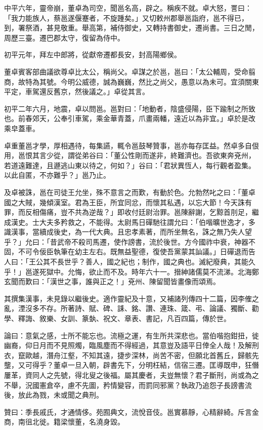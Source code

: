 \begin{pinyinscope}
中平六年，靈帝崩，董卓為司空，聞邕名高，辟之。稱疾不就。卓大怒，詈曰：「我力能族人，蔡邕遂偃蹇者，不旋踵矣。」又切敕州郡舉邕詣府，邕不得已，到，署祭酒，甚見敬重。舉高第，補侍御史，又轉持書御史，遷尚書。三日之閒，周歷三臺。遷巴郡太守，復留為侍中。

初平元年，拜左中郎將，從獻帝遷都長安，封高陽鄉侯。

董卓賓客部曲議欲尊卓比太公，稱尚父。卓謀之於邕，邕曰：「太公輔周，受命翦商，故特為其號。今明公威德，誠為巍巍，然比之尚父，愚意以為未可。宜須關東平定，車駕還反舊京，然後議之。」卓從其言。

初平二年六月，地震，卓以問邕。邕對曰：「地動者，陰盛侵陽，臣下踰制之所致也。前春郊天，公奉引車駕，乘金華青蓋，爪畫兩轓，遠近以為非宜。」卓於是改乘皁蓋車。

卓重董邕才學，厚相遇待，每集讌，輒令邕鼓琴贊事，邕亦每存匡益。然卓多自佷用，邕恨其言少從，謂從弟谷曰：「董公性剛而遂非，終難濟也。吾欲東奔兗州，若道遠難達，且遯逃山東以待之，何如？」谷曰：「君狀異恆人，每行觀者盈集。以此自匿，不亦難乎？」邕乃止。

及卓被誅，邕在司徒王允坐，殊不意言之而歎，有動於色。允勃然叱之曰：「董卓國之大賊，幾傾漢室。君為王臣，所宜同忿，而懷其私遇，以忘大節！今天誅有罪，而反相傷痛，豈不共為逆哉？」即收付廷尉治罪。邕陳辭謝，乞黥首刖足，繼成漢史。士大夫多矜救之，不能得。太尉馬日磾馳往謂允曰：「伯喈曠世逸才，多識漢事，當續成後史，為一代大典。且忠孝素著，而所坐無名，誅之無乃失人望乎？」允曰：「昔武帝不殺司馬遷，使作謗書，流於後世。方今國祚中衰，神器不固，不可令佞臣執筆在幼主左右。既無益聖德，復使吾黨蒙其訕議。」日磾退而告人曰：「王公其不長世乎？善人，國之紀也；制作，國之典也。滅紀廢典，其能久乎！」邕遂死獄中。允悔，欲止而不及。時年六十一。搢紳諸儒莫不流涕。北海鄭玄聞而歎曰：「漢世之事，誰與正之！」兗州、陳留聞皆畫像而頌焉。

其撰集漢事，未見錄以繼後史。適作靈紀及十意，又補諸列傳四十二篇，因李傕之亂，湮沒多不存。所著詩、賦、碑、誄、銘、讚、連珠、箴、弔、論議、獨斷、勸學、釋誨、敘樂、女訓、篆埶、祝文、章表、書記，凡百四篇，傳於世。

論曰：意氣之感，士所不能忘也。流極之運，有生所共深悲也。當伯喈抱鉗扭，徙幽裔，仰日月而不見照燭，臨風塵而不得經過，其意豈及語平日倖全人哉！及解刑衣，竄歐越，潛舟江壑，不知其遠，捷步深林，尚苦不密，但願北首舊丘，歸骸先壟，又可得乎？董卓一旦入朝，辟書先下，分明枉結，信宿三遷。匡導既申，狂僭屢革，資同人之先號，得北叟之後福。屬其慶者，夫豈無懷？君子斷刑，尚或為之不舉，況國憲倉卒，慮不先圖，矜情變容，而罰同邪黨？執政乃追怨子長謗書流後，放此為戮，未或聞之典刑。

贊曰：季長戚氏，才通情侈。苑囿典文，流悅音伎。邕實慕靜，心精辭綺。斥言金商，南徂北徙。籍梁懷董，名澆身毀。


\end{pinyinscope}